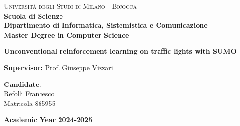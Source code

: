 \documentclass[a4paper,12pt,twoside]{book}
\begin{document}
    
    \begin{titlepage}
        
        \noindent
        \begin{minipage}[t]{0.19\textwidth}
        \end{minipage}
        \begin{minipage}[t]{0.81\textwidth}
        {
                {\textsc{Università degli Studi di Milano - Bicocca}} \\
                \textbf{Scuola di Scienze} \\
                \textbf{Dipartimento di Informatica, Sistemistica e Comunicazione} \\
                \textbf{Master Degree in Computer Science} \\
                \par
        }
        \end{minipage}
        
	\vspace{40mm}
        
	\begin{center}
            {\LARGE{
                    \textbf{Unconventional reinforcement learning on traffic lights with SUMO}
                    \par
            }}
        \end{center}
        
        \vspace{50mm}

        \noindent
        {\large \textbf{Supervisor:} Prof. Giuseppe Vizzari}
        
        \vspace{15mm}

        \begin{flushright}
            {\large \textbf{Candidate:}} \\
            \large{Refolli Francesco} \\
            \large{Matricola 865955} 
        \end{flushright}
        
        \vspace{35mm}
        \begin{center}
            {\large{\bf Academic Year 2024-2025}}
        \end{center}

        \restoregeometry
        
    \end{titlepage}

    
    \printindex
    \tableofcontents
    \printglossaries
    \renewcommand{\baselinestretch}{1.5}

    
    
    
    
    
    
    
    

    \printbibliography
\end{document}
